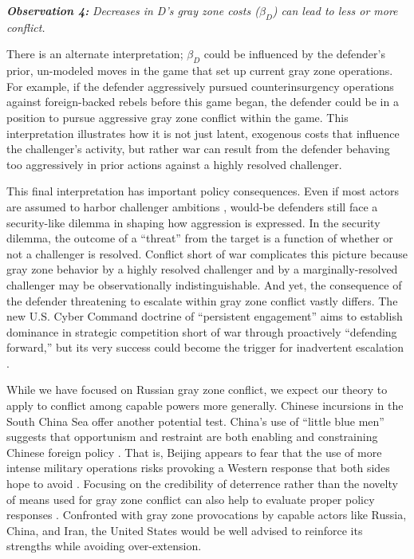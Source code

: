 \documentclass[11pt,letterpaper,pdftex,dvipsnames,table]{article}
\begin{document}
\textbf{\textit{Observation 4:}}\textit{ Decreases in D's gray zone costs ($\beta_{D}$) can lead to less or more conflict.}

There is an alternate interpretation; $\beta_{D}$ could be influenced by the defender's prior, un-modeled moves in the game that set up current gray zone operations. For example, if the defender aggressively pursued counterinsurgency operations against foreign-backed rebels before this game began, the defender could be in a position to pursue aggressive gray zone conflict within the game. This interpretation illustrates how it is not just latent, exogenous costs that influence the challenger's activity, but rather war can result from the defender behaving too aggressively in prior actions against a highly resolved challenger. 

This final interpretation has important policy consequences. Even if most actors are assumed to harbor challenger ambitions \citep{schweller_neorealismstatusquo_1996}, would-be defenders still face a security-like dilemma in shaping how aggression is expressed. In the security dilemma, the outcome of a ``threat'' from the target is a function of whether or not a challenger is resolved. Conflict short of war complicates this picture because gray zone behavior by a highly resolved challenger and by a marginally-resolved challenger may be observationally indistinguishable. And yet, the consequence of the defender threatening to escalate within gray zone conflict vastly differs. The new U.S. Cyber Command doctrine of ``persistent engagement'' aims to establish dominance in strategic competition short of war through proactively ``defending forward,'' but its very success could become the trigger for inadvertent escalation \citep{healey_escalationinversionother_2020}.

While we have focused on Russian gray zone conflict, we expect our theory to apply to conflict among capable powers more generally. Chinese incursions in the South China Sea offer another potential test. China’s use of ``little blue men'' suggests that opportunism and restraint are both enabling and constraining Chinese foreign policy \citep{erickson_directingchinalittle_2015, lin-greenberg_nontraditionalsecuritydilemmas_2018}. That is, Beijing appears to fear that the use of more intense military operations risks provoking a Western response that both sides hope to avoid \citep{zhang_cautiousbullyreputation_2019}. Focusing on the credibility of deterrence rather than the novelty of means used for gray zone conflict can also help to evaluate proper policy responses \citep{green_counteringcoercionmaritime_2017}. Confronted with gray zone provocations by capable actors like Russia, China, and Iran, the United States would be well advised to reinforce its strengths while avoiding over-extension.
\end{document}

